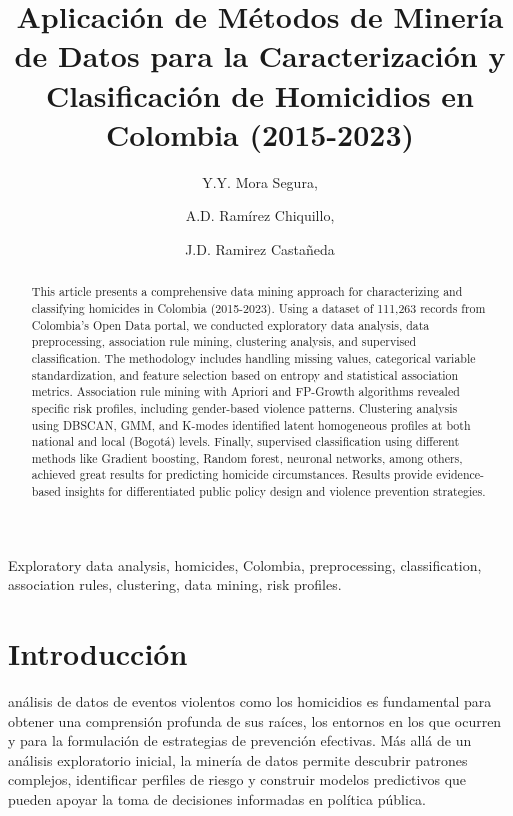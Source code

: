\documentclass[lettersize,journal]{IEEEtran}
\begin{document}
\title{Aplicación de Métodos de Minería de Datos para la Caracterización y Clasificación de Homicidios en Colombia (2015-2023)}

\author{
  Y.Y. Mora Segura, 
  \and
  A.D. Ramírez Chiquillo, 
  \and
  J.D. Ramirez Castañeda 
}
\maketitle
\begin{abstract}
This article presents a comprehensive data mining approach for characterizing and classifying homicides in Colombia (2015-2023). Using a dataset of 111,263 records from Colombia's Open Data portal, we conducted exploratory data analysis, data preprocessing, association rule mining, clustering analysis, and supervised classification. The methodology includes handling missing values, categorical variable standardization, and feature selection based on entropy and statistical association metrics. Association rule mining with Apriori and FP-Growth algorithms revealed specific risk profiles, including gender-based violence patterns. Clustering analysis using DBSCAN, GMM, and K-modes identified latent homogeneous profiles at both national and local (Bogotá) levels. Finally, supervised classification using different methods like Gradient boosting, Random forest, neuronal networks, among others, achieved great results for predicting homicide circumstances. Results provide evidence-based insights for differentiated public policy design and violence prevention strategies.
\end{abstract}


\begin{IEEEkeywords}
Exploratory data analysis, homicides, Colombia, preprocessing, classification, association rules, clustering, data mining, risk profiles.
\end{IEEEkeywords}

\section{Introducción}
 análisis de datos de eventos violentos como los homicidios es fundamental para obtener una comprensión profunda de sus raíces, los entornos en los que ocurren y para la formulación de estrategias de prevención efectivas. Más allá de un análisis exploratorio inicial, la minería de datos permite descubrir patrones complejos, identificar perfiles de riesgo y construir modelos predictivos que pueden apoyar la toma de decisiones informadas en política pública.
\end{document}
